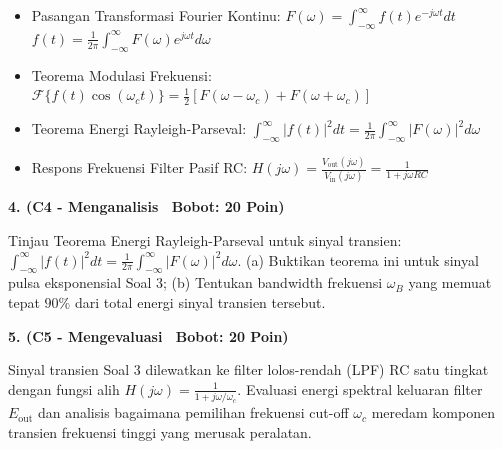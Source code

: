 \documentclass[10pt,a4paper]{article}
\begin{document}
\vfill

\begin{tcolorbox}[colback=unibblue!3,colframe=unibblue,colbacktitle=unibblue,coltitle=white,boxrule=0.6pt,arc=2pt,left=6pt,right=6pt,top=3pt,bottom=3pt,title=\textbf{\scriptsize FORMULA RUJUKAN TEKNIS \& STANDAR INDUSTRI TERKAIT}]
  \scriptsize
  \begin{itemize}[leftmargin=*, nosep]
  \item Pasangan Transformasi Fourier Kontinu: $F(\omega) = \int_{-\infty}^\infty f(t) e^{-j\omega t} dt$ \quad\textbar\quad $f(t) = \frac{1}{2\pi}\int_{-\infty}^\infty F(\omega) e^{j\omega t} d\omega$
  \item Teorema Modulasi Frekuensi: $\mathcal{F}\{f(t)\cos(\omega_c t)\} = \frac{1}{2}\left[F(\omega - \omega_c) + F(\omega + \omega_c)\right]$
  \item Teorema Energi Rayleigh-Parseval: $\int_{-\infty}^\infty |f(t)|^2 dt = \frac{1}{2\pi}\int_{-\infty}^\infty |F(\omega)|^2 d\omega$
  \item Respons Frekuensi Filter Pasif RC: $H(j\omega) = \frac{V_{\text{out}}(j\omega)}{V_{\text{in}}(j\omega)} = \frac{1}{1 + j\omega R C}$
\end{itemize}
\end{tcolorbox}

\newpage

\par
\vspace{1mm}

\noindent\textbf{4. (C4 - Menganalisis \textbar\ Bobot: 20 Poin)}\par\vspace{0.8mm}
{\footnotesize Tinjau Teorema Energi Rayleigh-Parseval untuk sinyal transien: $\int_{-\infty}^\infty |f(t)|^2 dt = \frac{1}{2\pi} \int_{-\infty}^\infty |F(\omega)|^2 d\omega$. (a) Buktikan teorema ini untuk sinyal pulsa eksponensial Soal 3; (b) Tentukan bandwidth frekuensi $\omega_B$ yang memuat tepat $90\%$ dari total energi sinyal transien tersebut.}\par

\vspace{3.5mm}

\noindent\textbf{5. (C5 - Mengevaluasi \textbar\ Bobot: 20 Poin)}\par\vspace{0.8mm}
{\footnotesize Sinyal transien Soal 3 dilewatkan ke filter lolos-rendah (LPF) RC satu tingkat dengan fungsi alih $H(j\omega) = \frac{1}{1 + j\omega/\omega_c}$. Evaluasi energi spektral keluaran filter $E_{\text{out}}$ dan analisis bagaimana pemilihan frekuensi cut-off $\omega_c$ meredam komponen transien frekuensi tinggi yang merusak peralatan.}\par
\end{document}

